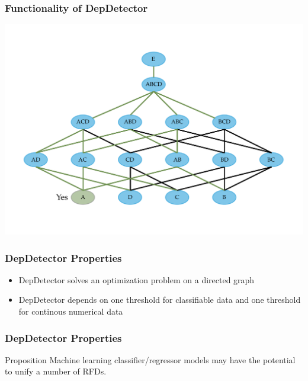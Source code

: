 \documentclass{beamer}
\begin{document}
\begin{frame}
    \frametitle{Functionality of DepDetector}
    \includegraphics[width=.95\textwidth]{min-dep-step-8.pdf}
\end{frame}

\begin{frame}
    \frametitle{DepDetector Properties}
    \begin{itemize}
        \item DepDetector solves an optimization problem on a directed graph
        \item DepDetector depends on one threshold for classifiable data and one threshold for continous numerical data
    \end{itemize}
\end{frame}

\begin{frame}
    \frametitle{DepDetector Properties}
    \begin{block}{Proposition}
        Machine learning classifier/regressor models may have the potential to unify a number of RFDs.
    \end{block}
\end{frame}
\end{document}
